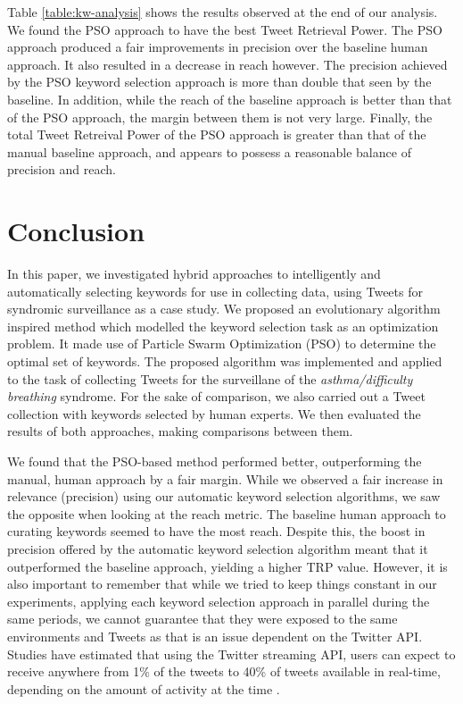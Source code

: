 \documentclass[runningheads]{llncs}
\begin{document}
Table \ref{table:kw-analysis} shows the results observed at the end of our analysis. We found the PSO approach to have the best Tweet Retrieval Power. The PSO approach produced a fair improvements in precision over the baseline human approach. It also resulted in a decrease in reach however. The precision achieved by the PSO keyword selection approach is more than double that seen by the baseline. In addition, while the reach of the baseline approach is better than that of the PSO approach, the margin between them is not very large. Finally, the total Tweet Retreival Power of the PSO approach is greater than that of the manual baseline approach, and appears to possess a reasonable balance of precision and reach.

\section{Conclusion}
In this paper, we investigated hybrid approaches to intelligently and automatically selecting keywords for use in collecting data, using Tweets for syndromic surveillance as a case study. We proposed an evolutionary algorithm inspired method which modelled the keyword selection task as an optimization problem. It made use of Particle Swarm Optimization (PSO) to determine the optimal set of keywords. The proposed algorithm was implemented and applied to the task of collecting Tweets for the surveillane of the \textit{asthma/difficulty breathing} syndrome. For the sake of comparison, we also carried out a Tweet collection with keywords selected by human experts. We then evaluated the results of both approaches, making comparisons between them.

We found that the PSO-based method performed better, outperforming the manual, human approach by a fair margin. While we observed a fair increase in relevance (precision) using our automatic keyword selection algorithms, we saw the opposite when looking at the reach metric. The baseline human approach to curating keywords seemed to have the most reach. Despite this, the boost in precision offered by the automatic keyword selection algorithm meant that it outperformed the baseline approach, yielding a higher TRP value. However, it is also important to remember that while we tried to keep things constant in our experiments, applying each keyword selection approach in parallel during the same periods, we cannot guarantee that they were exposed to the same environments and Tweets as that is an issue dependent on the Twitter API. Studies have estimated that using the Twitter streaming API, users can expect to receive anywhere  from 1\% of the tweets to 40\% of tweets available in real-time, depending on the amount of activity at the time \cite{K_REF8}. 
\end{document}
